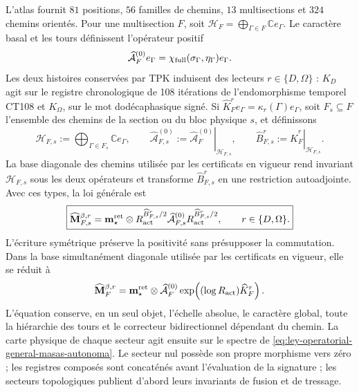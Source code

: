 L'atlas fournit \(81\) positions, \(56\) familles de chemins, \(13\)
multisections et \(324\) chemins orientés. Pour une multisection \(F\), soit
\(\mathcal H_F=\bigoplus_{\Gamma\in F}\mathbb C e_\Gamma\). Le caractère
basal et les tours définissent l'opérateur positif
\begin{equation}
 \widehat{\mathcal A}^{(0)}_F e_\Gamma
 =\chi_{\rm full}(\sigma_\Gamma,\eta_\Gamma)e_\Gamma.
 \label{eq:operador-caracter-basal-masas-autonoma}
\end{equation}
Les deux histoires conservées par TPK induisent des lecteurs
\(r\in\{D,\Omega\}\) : \(K_D\) agit sur le registre chronologique de
108 itérations de l'endomorphisme temporel CT108 et \(K_\Omega\), sur le mot
dodécaphasique signé. Si
\(\widehat K_F^r e_\Gamma=\kappa_r(\Gamma)e_\Gamma\), soit
\(F_s\subseteq F\) l'ensemble des chemins de la section ou du bloc physique \(s\), et
définissons
\begin{equation}
 \mathcal H_{F,s}:=\bigoplus_{\Gamma\in F_s}\mathbb C e_\Gamma,
 \qquad
 \widehat{\mathcal A}^{(0)}_{F,s}
 :=\left.\widehat{\mathcal A}^{(0)}_F\right|_{\mathcal H_{F,s}},
 \qquad
 \widehat B_{F,s}^r
 :=\left.\widehat K_F^r\right|_{\mathcal H_{F,s}}.
 \label{eq:restricciones-bloque-ley-masas-autonoma}
\end{equation}
La base diagonale des chemins utilisée par les certificats en vigueur rend invariant
\(\mathcal H_{F,s}\) sous les deux opérateurs et transforme
\(\widehat B_{F,s}^r\) en une restriction autoadjointe. Avec ces types, la loi
générale est
\begin{equation}
 \boxed{
 \widehat{\mathbf M}^{\beta,r}_{F,s}
 =\mathbf m_\star^{\rm ret}\otimes
  R_{\rm act}^{\widehat B_{F,s}^r/2}
  \widehat{\mathcal A}^{(0)}_{F,s}
  R_{\rm act}^{\widehat B_{F,s}^r/2},
 \qquad r\in\{D,\Omega\}.}
 \label{eq:ley-operatorial-general-masas-autonoma}
\end{equation}
L'écriture symétrique préserve la positivité sans présupposer la commutation. Dans la
base simultanément diagonale utilisée par les
certificats en vigueur, elle se réduit à
\begin{equation}
 \widehat{\mathbf M}^{\beta,r}_F
 =\mathbf m_\star^{\rm ret}\otimes
  \widehat{\mathcal A}^{(0)}_F
  \exp\!\left((\log R_{\rm act})\widehat K_F^r\right).
 \label{eq:ley-operatorial-diagonal-masas-autonoma}
\end{equation}
L'équation conserve, en un seul objet, l'échelle absolue, le caractère
global, toute la hiérarchie des tours et le correcteur bidirectionnel dépendant
du chemin. La carte physique de chaque secteur agit ensuite sur le spectre de
\eqref{eq:ley-operatorial-general-masas-autonoma}. Le secteur nul possède son
propre morphisme vers zéro ; les registres composés sont concaténés avant
l'évaluation de la signature ; les secteurs topologiques publient d'abord leurs invariants
de fusion et de tressage.

